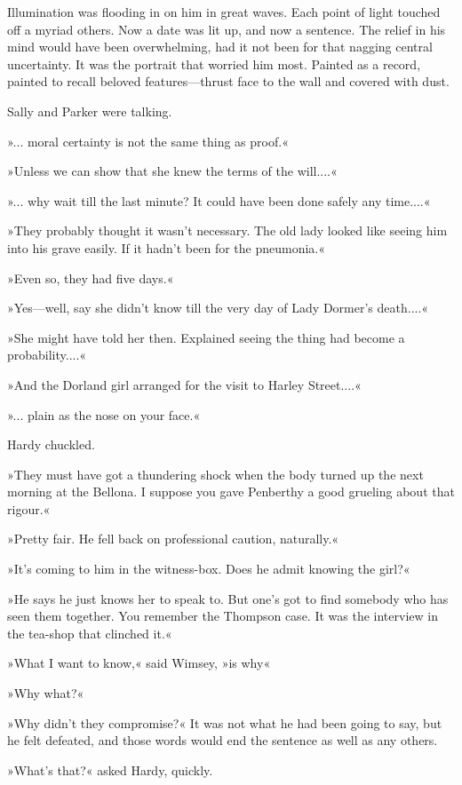 Illumination was flooding in on him in great waves. Each point of light touched off a myriad others. Now a date was lit up, and now a sentence. The relief in his mind would have been overwhelming, had it not been for that nagging central uncertainty. It was the portrait that worried him most. Painted as a record, painted to recall beloved features—thrust face to the wall and covered with dust.

Sally and Parker were talking.

»... moral certainty is not the same thing as proof.«

»Unless we can show that she knew the terms of the will....«

»... why wait till the last minute? It could have been done safely any time....«

»They probably thought it wasn't necessary. The old lady looked like seeing him into his grave easily. If it hadn't been for the pneumonia.«

»Even so, they had five days.«

»Yes—well, say she didn't know till the very day of Lady Dormer's death....«

»She might have told her then. Explained \textellipsis  seeing the thing had become a probability....«

»And the Dorland girl arranged for the visit to Harley Street....«

»... plain as the nose on your face.«

Hardy chuckled.

»They must have got a thundering shock when the body turned up the next morning at the Bellona. I suppose you gave Penberthy a good grueling about that rigour.«

»Pretty fair. He fell back on professional caution, naturally.«

»It's coming to him in the witness-box. Does he admit knowing the girl?«

»He says he just knows her to speak to. But one's got to find somebody who has seen them together. You remember the Thompson case. It was the interview in the tea-shop that clinched it.«

»What I want to know,« said Wimsey, »is why\longdash«

»Why what?«

»Why didn't they compromise?« It was not what he had been going to say, but he felt defeated, and those words would end the sentence as well as any others.

»What's that?« asked Hardy, quickly.

